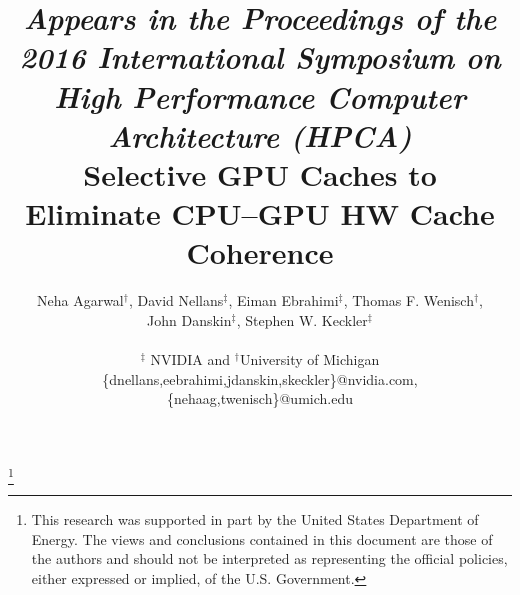 \documentclass{sig-alternate}
\title{
\vspace*{-0.45in}
{\normalsize \em Appears in the Proceedings of the 2016 International Symposium
 on High Performance Computer Architecture (HPCA)}
\\
\vspace*{0.35in}
\vspace{-0.2in}Selective GPU Caches to\\Eliminate CPU--GPU HW Cache Coherence\vspace{-0.3in}
}
\author{Neha Agarwal$^{\dagger}$, 
David Nellans$^{\ddagger}$,
Eiman Ebrahimi$^{\ddagger}$,
Thomas F. Wenisch$^{\dagger}$,\\
John Danskin$^{\ddagger}$,
Stephen W. Keckler$^{\ddagger}$\\\\
$^{\ddagger}$ NVIDIA and $^{\dagger}$University of Michigan \\
\{dnellans,eebrahimi,jdanskin,skeckler\}@nvidia.com, \{nehaag,twenisch\}@umich.edu
}
\begin{document}
\thanks{This research was supported in part by the United States Department of Energy. The views and conclusions contained in this document are those of the authors and 
should not be interpreted as representing the official policies, either expressed or implied, of the U.S. Government.}
\maketitle
\thispagestyle{firstpage}
\pagestyle{plain}










\end{document}
